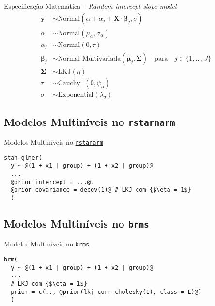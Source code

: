 \begin{frame}{Especificação Matemática -- \textit{Random-intercept-slope model}}
	$$
		\begin{aligned}
			\mathbf{y}           & \sim \text{Normal}\left( \alpha + \alpha_j + \mathbf{X} \cdot \boldsymbol{\beta}_j, \sigma \right) \\
			\alpha               & \sim \text{Normal}(\mu_\alpha, \sigma_\alpha)                                                      \\
			\alpha_j             & \sim \text{Normal}(0, \tau)                                                                        \\
			\boldsymbol{\beta}_j & \sim \text{Normal Multivariada}(\boldsymbol{\mu}_j, \boldsymbol{\Sigma})
			\quad \text{para}\quad j \in \{ 1, \dots, J \}                                                                            \\
			\boldsymbol{\Sigma}  & \sim \text{LKJ}(\eta)                                                                              \\
			\tau                 & \sim \text{Cauchy}^+(0, \psi_{\alpha})                                                             \\
			\sigma               & \sim \text{Exponential}(\lambda_\sigma)
		\end{aligned}
	$$
\end{frame}

\subsection{Modelos Multiníveis no \texttt{rstarnarm}}
\begin{frame}[fragile]{Modelos Multiníveis no \href{http://mc-stan.org/rstanarm/}{\texttt{rstanarm}}}
	\begin{lstlisting}[escapeinside=\{\}]
stan_glmer(
  y ~ @(1 + x1 | group) + (1 + x2 | group)@
  ...
  @prior_intercept = ...@,
  @prior_covariance = decov(1)@ # LKJ com {$\eta = 1$}
  )
  \end{lstlisting}
\end{frame}

\subsection{Modelos Multiníveis no \texttt{brms}}
\begin{frame}[fragile]{Modelos Multiníveis no \href{https://paul-buerkner.github.io/brms/}{\texttt{brms}}}
	\begin{lstlisting}[escapeinside=\{\}]
brm(
  y ~ @(1 + x1 | group) + (1 + x2 | group)@
  ...
  # LKJ com {$\eta = 1$}
  prior = c(.., @prior(lkj_corr_cholesky(1), class = L)@)
  )
  \end{lstlisting}
\end{frame}
